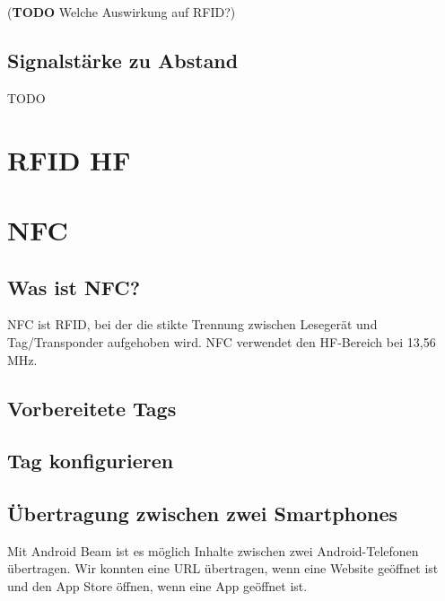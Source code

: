 \documentclass[paper=a4,fontsize=11pt,headsepline,footsepline,parskip=half]{scrartcl}
\begin{document}
(\textbf{TODO} Welche Auswirkung auf RFID?)

\subsection{Signalstärke zu Abstand}

TODO

\section{RFID HF}

\section{NFC}

\subsection{Was ist NFC?}

NFC ist RFID, bei der die stikte Trennung zwischen Lesegerät und Tag/Transponder aufgehoben wird.
NFC verwendet den HF-Bereich bei 13,56 MHz.

\subsection{Vorbereitete Tags}

\subsection{Tag konfigurieren}

\subsection{Übertragung zwischen zwei Smartphones}

Mit Android Beam ist es möglich Inhalte zwischen zwei Android-Telefonen übertragen.
Wir konnten eine URL übertragen, wenn eine Website geöffnet ist und den App Store
öffnen, wenn eine App geöffnet ist.
\end{document}
